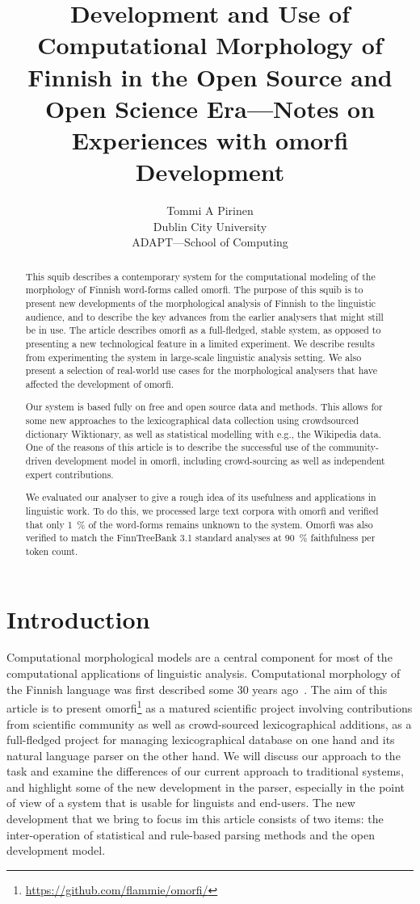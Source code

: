 \documentclass[a4paper,12pt]{article}
\title{Development and Use of Computational Morphology of Finnish in
the Open Source and Open Science Era---Notes on Experiences with omorfi
Development}
\author{Tommi A Pirinen \\
    Dublin City University\\
    ADAPT---School of Computing}
\date{}
\begin{document}
\maketitle
\begin{abstract}

    This squib describes a contemporary system for the computational modeling
    of the morphology of Finnish word-forms called omorfi. The purpose of this
    squib is to present new developments of the morphological analysis of
    Finnish to the linguistic audience, and to describe the key advances from
    the earlier analysers that might still be in use. The article describes
    omorfi as a full-fledged, stable system, as opposed to presenting a new
    technological feature in a limited experiment. We describe results from
    experimenting the system in large-scale linguistic analysis setting. We also
    present a selection of real-world use cases for the morphological analysers
    that have affected the development of omorfi.

    Our system is based fully on free and open source data and methods. This
    allows for some new approaches to the lexicographical data collection using
    crowd\-sour\-ced dictionary Wiktionary, as well as statistical modelling
    with e.g., the Wikipedia data.  One of the reasons of this article is to 
    describe the successful use of the community-driven development model in
    omorfi, including crowd-sourcing as well as independent expert
    contributions.

    We evaluated our analyser to give a rough idea of its usefulness and
    applications in linguistic work. To do this, we processed large text
    corpora with omorfi and verified that only 1~\% of the word-forms
    remains unknown to the system. Omorfi was also verified to match the
    FinnTreeBank 3.1 standard analyses at 90~\% faithfulness per token
    count.
\end{abstract}

\section{Introduction}

Computational morphological models are a central
component for most of the computational applications
of linguistic analysis. Computational morphology of
the Finnish language was first described some 30
years ago~\citep{koskenniemi1983twolevel}. The aim
of this article is to present omorfi\footnote{
\url{https://github.com/flammie/omorfi/}} as a
matured scientific project involving contributions
from scientific community as well as crowd-sourced
lexicographical additions, as a full-fledged project
for managing lexicographical database on one hand
and its natural language parser on the other hand.
We will discuss our approach to the task and examine
the differences of our current approach to
traditional systems, and highlight some of the new
development in the parser, especially in the point
of view of a system that is usable for linguists and
end-users. The new development that we bring to
focus im this article consists of two items: the
inter-operation of statistical and rule-based
parsing methods and the open development model.
\end{document}
